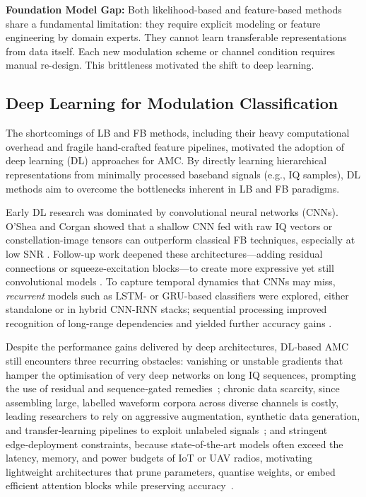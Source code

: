 \textbf{Foundation Model Gap:} Both likelihood-based and feature-based methods share a fundamental limitation: they require explicit modeling or feature engineering by domain experts. They cannot learn transferable representations from data itself. Each new modulation scheme or channel condition requires manual re-design. This brittleness motivated the shift to deep learning.

\subsection{Deep Learning for Modulation Classification}

The shortcomings of LB and FB methods, including their heavy computational overhead and fragile hand-crafted feature pipelines, motivated the adoption of deep learning (DL) approaches for AMC. By directly learning hierarchical representations from minimally processed baseband signals (e.g., IQ samples), DL methods aim to overcome the bottlenecks inherent in LB and FB paradigms.

Early DL research was dominated by convolutional neural networks (CNNs).  O'Shea and Corgan showed that a shallow CNN fed with raw IQ vectors or constellation-image tensors can outperform classical FB techniques, especially at low SNR \cite{o2016convolutional}.  Follow-up work deepened these architectures—adding residual connections or squeeze-excitation blocks—to create more expressive yet still convolutional models \cite{8963964}.  To capture temporal dynamics that CNNs may miss, \emph{recurrent} models such as LSTM- or GRU-based classifiers were explored, either standalone or in hybrid CNN-RNN stacks; sequential processing improved recognition of long-range dependencies and yielded further accuracy gains \cite{10505944}.  

Despite the performance gains delivered by deep architectures, DL‑based AMC still encounters three recurring obstacles: vanishing or unstable gradients that hamper the optimisation of very deep networks on long IQ sequences, prompting the use of residual and sequence‑gated remedies~\cite{liao2021sequential}; chronic data scarcity, since assembling large, labelled waveform corpora across diverse channels is costly, leading researchers to rely on aggressive augmentation, synthetic data generation, and transfer‑learning pipelines to exploit unlabeled signals~\cite{bu2020adversarial,zheng2021spectrum}; and stringent edge‑deployment constraints, because state‑of‑the‑art models often exceed the latency, memory, and power budgets of IoT or UAV radios, motivating lightweight architectures that prune parameters, quantise weights, or embed efficient attention blocks while preserving accuracy~\cite{wang2023automatic}.

